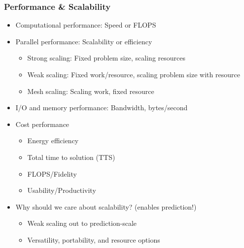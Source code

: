 \begin{frame}\frametitle{Performance \& Scalability}
\begin{itemize}
\item Computational performance: Speed or FLOPS
\item Parallel performance: Scalability or efficiency
\begin{itemize}
\item Strong scaling: Fixed problem size, scaling resources
\item Weak scaling: Fixed work/resource, scaling problem size with resource
\item Mesh scaling: Scaling work, fixed resource
\end{itemize}
\item I/O and memory performance: Bandwidth, bytes/second
\item Cost performance
\begin{itemize}
\item Energy efficiency
\item Total time to solution (TTS)
\item FLOPS/Fidelity
\item Usability/Productivity
\end{itemize}
\item Why should we care about scalability? (enables prediction!)
\begin{itemize}
\item Weak scaling out to prediction-scale
\item Versatility, portability, and resource options
\end{itemize}
\end{itemize}
\end{frame}

